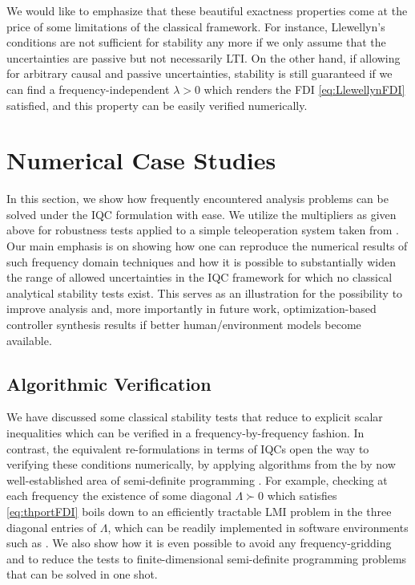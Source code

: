 We would like to emphasize that these beautiful exactness properties come at the price of some limitations 
of the classical framework. For instance, Llewellyn's conditions are not sufficient for stability any more 
if we only assume that the uncertainties are passive but not necessarily LTI. On the other hand, if allowing 
for arbitrary causal and passive uncertainties, stability is still guaranteed if we can find a 
frequency-independent $\lambda>0$ which renders the FDI \eqref{eq:LlewellynFDI} satisfied, and this property 
can be easily verified numerically.

\section{Numerical Case Studies}\label{sec:num}
In this section, we show how frequently encountered analysis problems can be solved 
under the IQC formulation with ease. We utilize the multipliers as given above for  
robustness tests applied to a simple teleoperation system taken from \cite{willaert,
willaertIJRR10}. Our main emphasis is on showing how one can reproduce the numerical 
results of such frequency domain techniques and 
how it is possible to substantially widen the range of allowed uncertainties in the 
IQC framework for which no classical analytical stability tests exist. This serves as 
an illustration for the possibility to improve analysis and, more importantly in 
future work, optimization-based controller synthesis results if better human/environment 
models become available.

\subsection{Algorithmic Verification}\label{sec:algver}

We have discussed some classical stability tests that reduce to explicit scalar 
inequalities which can be verified in a frequency-by-frequency fashion. In contrast, 
the equivalent re-formulations in terms of IQCs open the way to verifying these conditions 
numerically, by applying algorithms from the by now well-established area of semi-definite 
programming \cite{lmiboydbook}. For example, checking at each frequency the existence of 
some diagonal $\Lambda\succ 0$ which satisfies \eqref{eq:thportFDI} boils down to an 
efficiently tractable LMI problem in the three diagonal entries of $\Lambda$, which 
can be readily implemented in software environments such as \cite{yalmip}. We also 
show how it is even possible to avoid any frequency-gridding and to reduce the tests 
to finite-dimensional semi-definite programming problems that can be solved in one shot.

